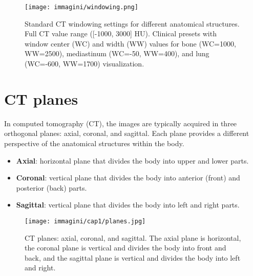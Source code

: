 \begin{figure}
    \centering
    \texttt{[image: immagini/windowing.png]}
    \caption{Standard CT windowing settings for different anatomical structures. Full CT value range ([-1000, 3000] HU). Clinical presets with window center (WC) and width (WW) values for bone (WC=1000, WW=2500), mediastinum (WC=-50, WW=400), and lung (WC=-600, WW=1700) visualization.}
    \label{fig:windowing_lung}
\end{figure}



\section{CT planes}
In computed tomography (CT), the images are typically acquired in three orthogonal planes: axial, coronal, and sagittal. Each plane provides a different perspective of the anatomical structures within the body.
\begin{itemize}
    \item \textbf{Axial}: horizontal plane that divides the body into upper and lower parts.
    \item \textbf{Coronal}: vertical plane that divides the body into anterior (front) and posterior (back) parts.
    \item \textbf{Sagittal}: vertical plane that divides the body into left and right parts.
\end{itemize}

\begin{figure}[h!]
    \centering
    \texttt{[image: immagini/cap1/planes.jpg]}
    \caption{CT planes: axial, coronal, and sagittal. The axial plane is horizontal, the coronal plane is vertical and divides the body into front and back, and the sagittal plane is vertical and divides the body into left and right.}
    \label{fig:ct_planes}
\end{figure}
